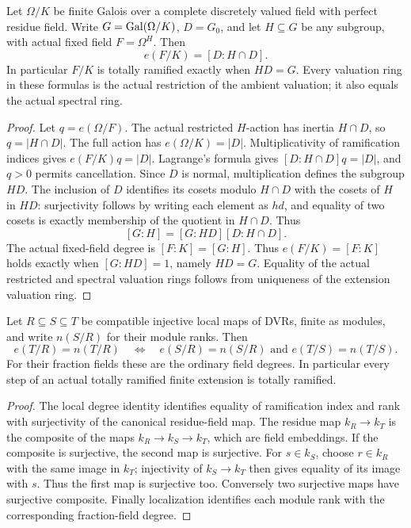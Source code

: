 \begin{lemma}
\label{fw:inertia-relative-index}
\leanok
Let $\Omega/K$ be finite Galois over a complete discretely valued
field with perfect residue field. Write $G=\operatorname{Gal}(\Omega/K)$,
$D=G_0$, and let $H\subseteq G$ be any subgroup, with actual
fixed field $F=\Omega^H$. Then
\[
 e(F/K)=[D:H\cap D].
\]
In particular $F/K$ is totally ramified exactly when $HD=G$.
Every valuation ring in these formulas is the actual restriction
of the ambient valuation; it also equals the actual spectral ring.
\end{lemma}
\begin{proof}
Let $q=e(\Omega/F)$. The actual restricted $H$-action has inertia
$H\cap D$, so $q=|H\cap D|$. The full action has
$e(\Omega/K)=|D|$. Multiplicativity of ramification indices gives
$e(F/K)q=|D|$. Lagrange's formula gives
$[D:H\cap D]q=|D|$, and $q>0$ permits cancellation.
Since $D$ is normal, multiplication defines the subgroup $HD$.
The inclusion of $D$ identifies its cosets modulo $H\cap D$
with the cosets of $H$ in $HD$: surjectivity follows by writing
each element as $hd$, and equality of two cosets is exactly
membership of the quotient in $H\cap D$. Thus
\[
 [G:H]=[G:HD][D:H\cap D].
\]
The actual fixed-field degree is $[F:K]=[G:H]$. Thus
$e(F/K)=[F:K]$ holds exactly when $[G:HD]=1$, namely $HD=G$.
Equality of the actual restricted
and spectral valuation rings follows from uniqueness of the
extension valuation ring.
\end{proof}

\begin{lemma}
\label{fw:total-ramification-tower}
\leanok
Let $R\subseteq S\subseteq T$ be compatible injective local maps
of DVRs, finite as modules, and write $n(S/R)$ for their module
ranks. Then
\[
 e(T/R)=n(T/R)\quad\Longleftrightarrow\quad
 e(S/R)=n(S/R)\text{ and }e(T/S)=n(T/S).
\]
For their fraction fields these are the ordinary field degrees.
In particular every step of an actual totally ramified finite
extension is totally ramified.
\end{lemma}
\begin{proof}
The local degree identity identifies equality of ramification index
and rank with surjectivity of the canonical residue-field map.
The residue map $k_R\to k_T$ is the composite of the maps
$k_R\to k_S\to k_T$, which are field embeddings. If the composite
is surjective, the second map is surjective. For $s\in k_S$,
choose $r\in k_R$ with the same image in $k_T$; injectivity of
$k_S\to k_T$ then gives equality of its image with $s$. Thus the
first map is surjective too. Conversely two surjective maps have
surjective composite. Finally localization identifies each module
rank with the corresponding fraction-field degree.
\end{proof}

